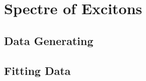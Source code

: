 
\chapter{Spectre of Excitons}
\label{sec:excitons}

\section{Data Generating}
\section{Fitting Data}